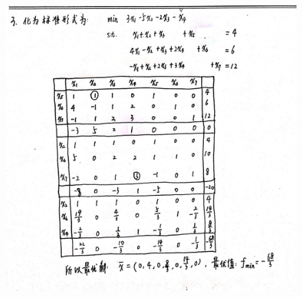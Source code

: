 \documentclass[a4paper]{article}
\begin{document}
\begin{figure}[htbp]
	\centering
	\includegraphics[height=18cm]{img_0334.jpg}
\end{figure}
\end{document}
